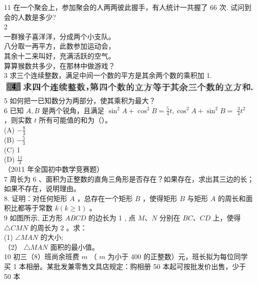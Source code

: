 \documentclass[10pt]{article}
\begin{document}
11 在一个聚会上，参加聚会的人两两彼此握手，有人统计一共握了 66 次. 试问到会的人数是多少?\\
2\\
一群猴子喜洋洋，分成两个小支队。\\
八分取一再平方，此数参加运动会，\\
其余十二来叫好，充满活跃的空气。\\
算算猴数共多少，在那林中做游戏？\\
3 求三个连续整数，满足中间一个数的平方是其余两个数的乘积加 1.\\
\includegraphics[max width=\textwidth, center]{2024_10_30_26b590fd1106d28139f0g-120(1)}\\
5 如何把一已知数分为两部分，使其乘积为最大？\\
6 已知 $A, B$ 是两个锐角，且满足 $\sin ^{2} A+\cos ^{2} B=\frac{5}{4} t, \cos ^{2} A+\sin ^{2} B=$ $\frac{3}{4} t^{2}$ ，则实数 $t$ 所有可能值的和为（）。\\
(A) $-\frac{8}{3}$\\
(B) $-\frac{5}{3}$\\
(C) 1\\
(D) $\frac{11}{3}$\\
（2011 年全国初中数学竞赛题）\\
7 周长为 6 、面积为正整数的直角三角形是否存在？如果存在，求出其三边的长；如果不存在，说明理由。\\
8. 证明：对任何矩形 $A$ ，总存在一个矩形 $B$ ，使得矩形 $B$ 与矩形 $A$ 的周长和面积比都等于常数 $k(k \geqslant 1)$ 。\\
9 如图所示, 正方形 $A B C D$ 的边长为 1 , 点 $M 、 N$ 分别在 $B C 、 C D$ 上，使得 $\triangle C M N$ 的周长为 2 。求：\\
(1) $\angle M A N$ 的大小;\\
（2） $\triangle M A N$ 面积的最小值。\\
10 初三（8）班尚余班费 $m$ （ $m$ 为小于 400 的正整数）元，班长拟为每位同学买 1 本相册。某批发兼零售文具店规定：购相册 50 本起可按批发价出售，少于 50 本\\
\end{document}
